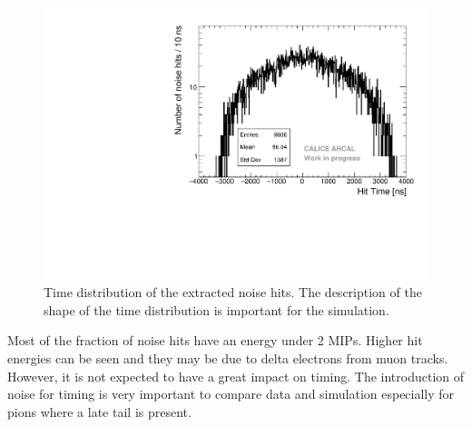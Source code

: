 \begin{figure}[htbp!]
	\centering
	\includegraphics[width=0.7\linewidth]{../Thesis_Plots/Timing/Muons/Plots/Noise_Time_Flat.pdf}
	\caption{Time distribution of the extracted noise hits. The description of the shape of the time distribution is important for the simulation.} \label{fig:noise_time}
\end{figure}

Most of the fraction of noise hits have an energy under 2 MIPs. Higher hit energies can be seen and they may be due to delta electrons from muon tracks. However, it is not expected to have a great impact on timing. The introduction of noise for timing is very important to compare data and simulation especially for pions where a late tail is present.
